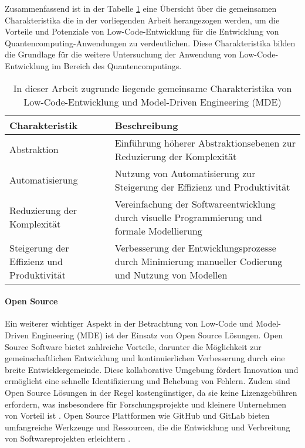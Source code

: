 Zusammenfassend ist in der Tabelle \ref{tab:common_characteristics} eine Übersicht über die gemeinsamen Charakteristika die 
in der vorliegenden Arbeit herangezogen werden, um die Vorteile und Potenziale von Low-Code-Entwicklung 
für die Entwicklung von Quantencomputing-Anwendungen zu verdeutlichen. Diese Charakteristika bilden die Grundlage für die 
weitere Untersuchung der Anwendung von Low-Code-Entwicklung im Bereich des Quantencomputings. 

\begin{table}[h!]
    \centering
    \begin{tabular}{|p{5cm}|p{9cm}|}
    \hline
    \textbf{Charakteristik} & \textbf{Beschreibung} \\
    \hline
    Abstraktion & Einführung höherer Abstraktionsebenen zur Reduzierung der Komplexität \\
    \hline
    Automatisierung & Nutzung von Automatisierung zur Steigerung der Effizienz und Produktivität \\
    \hline
    Reduzierung der Komplexität & Vereinfachung der Softwareentwicklung durch visuelle Programmierung und formale Modellierung \\
    \hline
    Steigerung der Effizienz und Produktivität & Verbesserung der Entwicklungsprozesse durch Minimierung manueller Codierung und Nutzung von Modellen \\
    \hline
    \end{tabular}
    \caption{In dieser Arbeit zugrunde liegende gemeinsame Charakteristika von Low-Code-Entwicklung und Model-Driven Engineering (MDE)}
    \label{tab:common_characteristics}
\end{table}


\paragraph{Open Source}
Ein weiterer wichtiger Aspekt in der Betrachtung von Low-Code und Model-Driven Engineering (MDE) ist der 
Einsatz von Open Source Lösungen. Open Source Software bietet zahlreiche Vorteile, darunter die Möglichkeit 
zur gemeinschaftlichen Entwicklung und kontinuierlichen Verbesserung durch eine breite Entwicklergemeinde. 
Diese kollaborative Umgebung fördert Innovation und ermöglicht eine schnelle Identifizierung und Behebung 
von Fehlern. Zudem sind Open Source Lösungen in der Regel kostengünstiger, da sie keine Lizenzgebühren 
erfordern, was insbesondere für Forschungsprojekte und kleinere Unternehmen von Vorteil 
ist \cite{raymond2010cathedral}. Open Source Plattformen wie GitHub und GitLab bieten umfangreiche Werkzeuge und 
Ressourcen, die die Entwicklung und Verbreitung von Softwareprojekten erleichtern \cite{fitzgerald2006transformation}.


